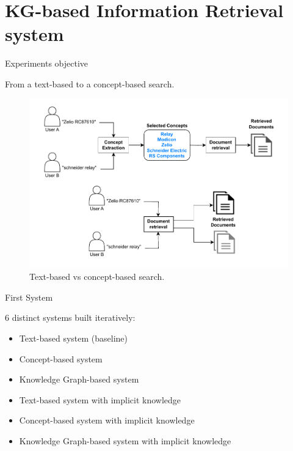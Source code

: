\section{KG-based Information Retrieval system}

\begin{frame}{Experiments objective}

    \begin{center}
        From a text-based to a concept-based search.
    \end{center}

    \begin{figure} [H]
        \begin{center}
            \includegraphics[scale=0.6]{images/text-vs-concept-based-search.pdf} 
            \caption{Text-based vs concept-based search.} 
        \end{center}
    \end{figure}

\end{frame}

\begin{frame}{First System}

    6 distinct systems built iteratively:
    \begin{itemize}
        \item Text-based system (baseline)
        \item Concept-based system
        \item Knowledge Graph-based system
        \item Text-based system with implicit knowledge
        \item Concept-based system with implicit knowledge
        \item Knowledge Graph-based system with implicit knowledge
    \end{itemize}
    

\end{frame}

